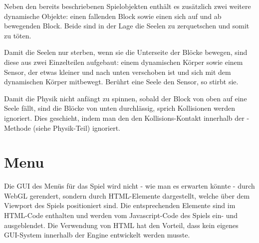 
Neben den bereits beschriebenen Spielobjekten enthält es zusätzlich zwei weitere dynamische Objekte: einen fallenden Block sowie einen sich auf und ab bewegenden Block. Beide sind in der Lage die Seelen zu zerquetschen und somit zu töten.

Damit die Seelen nur sterben, wenn sie die Unterseite der Blöcke bewegen, sind diese aus zwei Einzelteilen aufgebaut: einem dynamischen Körper sowie einem Sensor, der etwas kleiner und nach unten verschoben ist und sich mit dem dynamischen Körper mitbewegt. Berührt eine Seele den Sensor, so stirbt sie.

Damit die Physik nicht anfängt zu spinnen, sobald der Block von oben auf eine Seele fällt, sind die Blöcke von unten durchlässig, sprich Kollisionen werden ignoriert. Dies geschieht, indem man den den Kollisions-Kontakt innerhalb der -Methode (siehe Physik-Teil) ignoriert.

\section{Menu}

Die GUI des Menüs für das Spiel wird nicht - wie man es erwarten könnte - durch WebGL gerendert, sondern durch HTML-Elemente dargestellt, welche über dem Viewport des Spiels positioniert sind. Die entsprechenden Elemente sind im HTML-Code enthalten und werden vom Javascript-Code des Spiels ein- und ausgeblendet. Die Verwendung von HTML hat den Vorteil, dass kein eigenes GUI-System innerhalb der Engine entwickelt werden musste.

